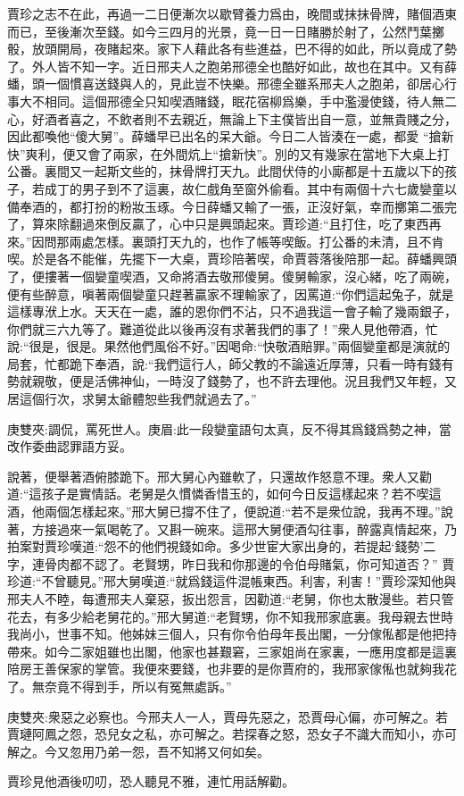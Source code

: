 \begin{parag}
    賈珍之志不在此，再過一二日便漸次以歇臂養力爲由，晚間或抹抹骨牌，賭個酒東而已，至後漸次至錢。如今三四月的光景，竟一日一日賭勝於射了，公然鬥葉擲骰，放頭開局，夜賭起來。家下人藉此各有些進益，巴不得的如此，所以竟成了勢了。外人皆不知一字。近日邢夫人之胞弟邢德全也酷好如此，故也在其中。又有薛蟠，頭一個慣喜送錢與人的，見此豈不快樂。邢德全雖系邢夫人之胞弟，卻居心行事大不相同。這個邢德全只知喫酒賭錢，眠花宿柳爲樂，手中濫漫使錢，待人無二心，好酒者喜之，不飲者則不去親近，無論上下主僕皆出自一意，並無貴賤之分，因此都喚他“傻大舅”。薛蟠早已出名的呆大爺。今日二人皆湊在一處，都愛 “搶新快”爽利，便又會了兩家，在外間炕上“搶新快”。別的又有幾家在當地下大桌上打公番。裏間又一起斯文些的，抹骨牌打天九。此間伏侍的小廝都是十五歲以下的孩子，若成丁的男子到不了這裏，故仁戲角至窗外偷看。其中有兩個十六七歲孌童以備奉酒的，都打扮的粉妝玉琢。今日薛蟠又輸了一張，正沒好氣，幸而擲第二張完了，算來除翻過來倒反贏了，心中只是興頭起來。賈珍道:“且打住，吃了東西再來。”因問那兩處怎樣。裏頭打天九的，也作了帳等喫飯。打公番的未清，且不肯喫。於是各不能催，先擺下一大桌，賈珍陪著喫，命賈蓉落後陪那一起。薛蟠興頭了，便摟著一個孌童喫酒，又命將酒去敬邢傻舅。傻舅輸家，沒心緒，吃了兩碗，便有些醉意，嗔著兩個孌童只趕著贏家不理輸家了，因罵道:“你們這起兔子，就是這樣專洑上水。天天在一處，誰的恩你們不沾，只不過我這一會子輸了幾兩銀子，你們就三六九等了。難道從此以後再沒有求著我們的事了！”衆人見他帶酒，忙說:“很是，很是。果然他們風俗不好。”因喝命:“快敬酒賠罪。”兩個孌童都是演就的局套，忙都跪下奉酒，說:“我們這行人，師父教的不論遠近厚薄，只看一時有錢有勢就親敬，便是活佛神仙，一時沒了錢勢了，也不許去理他。況且我們又年輕，又居這個行次，求舅太爺體恕些我們就過去了。”\begin{note}庚雙夾:調侃，罵死世人。庚眉:此一段孌童語句太真，反不得其爲錢爲勢之神，當改作委曲認罪語方妥。\end{note}說著，便舉著酒俯膝跪下。邢大舅心內雖軟了，只還故作怒意不理。衆人又勸道:“這孩子是實情話。老舅是久慣憐香惜玉的，如何今日反這樣起來？若不喫這酒，他兩個怎樣起來。”邢大舅已撐不住了，便說道:“若不是衆位說，我再不理。”說著，方接過來一氣喝乾了。又斟一碗來。這邢大舅便酒勾往事，醉露真情起來，乃拍案對賈珍嘆道:“怨不的他們視錢如命。多少世宦大家出身的，若提起‘錢勢’二字，連骨肉都不認了。老賢甥，昨日我和你那邊的令伯母賭氣，你可知道否？” 賈珍道:“不曾聽見。”邢大舅嘆道:“就爲錢這件混帳東西。利害，利害！”賈珍深知他與邢夫人不睦，每遭邢夫人棄惡，扳出怨言，因勸道:“老舅，你也太散漫些。若只管花去，有多少給老舅花的。”邢大舅道:“老賢甥，你不知我邢家底裏。我母親去世時我尚小，世事不知。他姊妹三個人，只有你令伯母年長出閣，一分傢俬都是他把持帶來。如今二家姐雖也出閣，他家也甚艱窘，三家姐尚在家裏，一應用度都是這裏陪房王善保家的掌管。我便來要錢，也非要的是你賈府的，我邢家傢俬也就夠我花了。無奈竟不得到手，所以有冤無處訴。”\begin{note}庚雙夾:衆惡之必察也。今邢夫人一人，賈母先惡之，恐賈母心偏，亦可解之。若賈璉阿鳳之怨，恐兒女之私，亦可解之。若探春之怒，恐女子不識大而知小，亦可解之。今又忽用乃弟一怨，吾不知將又何如矣。\end{note}賈珍見他酒後叨叨，恐人聽見不雅，連忙用話解勸。
\end{parag}


